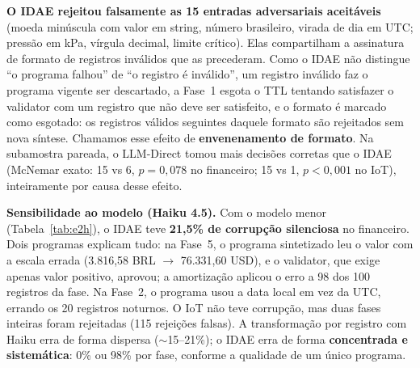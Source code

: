 \documentclass[sigconf,nonacm]{acmart}
\begin{document}
\textbf{O IDAE rejeitou falsamente as 15 entradas adversariais aceitáveis} (moeda minúscula com valor em string, número brasileiro, virada de dia em UTC; pressão em kPa, vírgula decimal, limite crítico). Elas compartilham a assinatura de formato de registros inválidos que as precederam. Como o IDAE não distingue ``o programa falhou'' de ``o registro é inválido'', um registro inválido faz o programa vigente ser descartado, a Fase~1 esgota o TTL tentando satisfazer o validator com um registro que não deve ser satisfeito, e o formato é marcado como esgotado: os registros válidos seguintes daquele formato são rejeitados sem nova síntese. Chamamos esse efeito de \textbf{envenenamento de formato}. Na subamostra pareada, o LLM-Direct tomou mais decisões corretas que o IDAE (McNemar exato: 15 vs 6, $p = 0{,}078$ no financeiro; 15 vs 1, $p < 0{,}001$ no IoT), inteiramente por causa desse efeito.

\textbf{Sensibilidade ao modelo (Haiku 4.5).} Com o modelo menor (Tabela~\ref{tab:e2h}), o IDAE teve \textbf{21,5\% de corrupção silenciosa} no financeiro. Dois programas explicam tudo: na Fase~5, o programa sintetizado leu o valor com a escala errada (3.816,58 BRL $\to$ 76.331,60 USD), e o validator, que exige apenas valor positivo, aprovou; a amortização aplicou o erro a 98 dos 100 registros da fase. Na Fase~2, o programa usou a data local em vez da UTC, errando os 20 registros noturnos. O IoT não teve corrupção, mas duas fases inteiras foram rejeitadas (115 rejeições falsas). A transformação por registro com Haiku erra de forma dispersa ($\sim$15--21\%); o IDAE erra de forma \textbf{concentrada e sistemática}: 0\% ou 98\% por fase, conforme a qualidade de um único programa.

\begin{table}[h]
\caption{E2 --- Haiku 4.5 (mesmos fluxos e subamostras)}
\label{tab:e2h}
\end{table}
\end{document}
